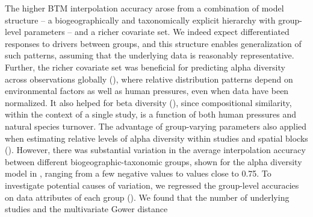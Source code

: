 The higher BTM interpolation accuracy arose from a combination of model structure -- a biogeographically and taxonomically explicit hierarchy with group-level parameters -- and a richer covariate set. We indeed expect differentiated responses to drivers between groups, and this structure enables generalization of such patterns, assuming that the underlying data is reasonably representative. Further, the richer covariate set was beneficial for predicting alpha diversity across observations globally (), where relative distribution patterns depend on environmental factors as well as human pressures, even when data have been normalized. It also helped for beta diversity (), since compositional similarity, within the context of a single study, is a function of both human pressures and natural species turnover. The advantage of group-varying parameters also applied when estimating relative levels of alpha diversity within studies and spatial blocks (). However, there was substantial variation in the average interpolation accuracy between different biogeographic-taxonomic groups, shown for the alpha diversity model in , ranging from a few negative values to values close to 0.75. To investigate potential causes of variation, we regressed the group-level accuracies on data attributes of each group (). We found that the number of underlying studies and the multivariate Gower distance


